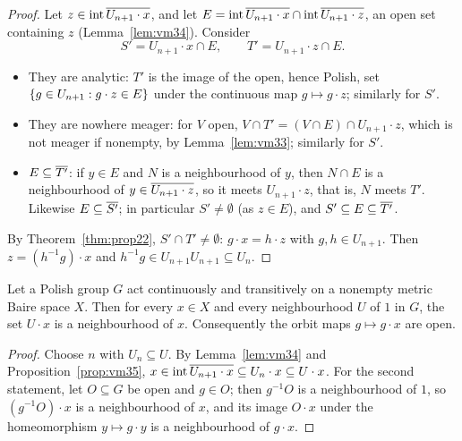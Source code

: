 \begin{proof}
Let $z\in\operatorname{int}\overline{U_{n+1}\cdot x}$, and let $E=\operatorname{int}\overline{U_{n+1}\cdot x}\cap\operatorname{int}\overline{U_{n+1}\cdot
z}$, an open set containing $z$ (Lemma~\ref{lem:vm34}). Consider
\[
S'=U_{n+1}\cdot x\cap E,\qquad T'=U_{n+1}\cdot z\cap E .
\]
\begin{itemize}
\item They are analytic: $T'$ is the image of the open, hence Polish, set
$\left\{ g\in U_{n+1}:g\cdot z\in E \right\}$ under the continuous map $g\mapsto g\cdot z$; similarly for $S'$.
\item They are nowhere meager: for $V$ open, $V\cap T'=(V\cap E)\cap U_{n+1}\cdot z$, which is not meager
if nonempty, by Lemma~\ref{lem:vm33}; similarly for $S'$.
\item $E\subseteq\overline{T'}$: if $y\in E$ and $N$ is a neighbourhood of $y$, then $N\cap E$ is a neighbourhood of
$y\in\overline{U_{n+1}\cdot z}$, so it meets $U_{n+1}\cdot z$, that is, $N$ meets $T'$. Likewise $E\subseteq\overline{S'}$;
in particular $S'\ne\emptyset$ (as $z\in E$), and $S'\subseteq E\subseteq\overline{T'}$.
\end{itemize}
By Theorem~\ref{thm:prop22}, $S'\cap T'\ne\emptyset$: $g\cdot x=h\cdot z$ with $g,h\in U_{n+1}$. Then
$z=(h^{-1}g)\cdot x$ and $h^{-1}g\in U_{n+1}U_{n+1}\subseteq U_n$.
\end{proof}


\begin{theorem}\label{thm:effros-open}
Let a Polish group $G$ act continuously and transitively on a nonempty metric Baire space $X$. Then
for every $x\in X$ and every neighbourhood $U$ of $1$ in $G$, the set $U\cdot x$ is a neighbourhood of
$x$. Consequently the orbit maps $g\mapsto g\cdot x$ are open.
\end{theorem}

\begin{proof}
Choose $n$ with $U_n\subseteq U$. By Lemma~\ref{lem:vm34} and Proposition~\ref{prop:vm35},
$x\in\operatorname{int}\overline{U_{n+1}\cdot x}\subseteq U_n\cdot x\subseteq U\cdot x$. For the second statement, let $O\subseteq G$
be open and $g\in O$; then $g^{-1}O$ is a neighbourhood of $1$, so $(g^{-1}O)\cdot x$ is a neighbourhood
of $x$, and its image $O\cdot x$ under the homeomorphism $y\mapsto g\cdot y$ is a neighbourhood of $g\cdot
x$.
\end{proof}


